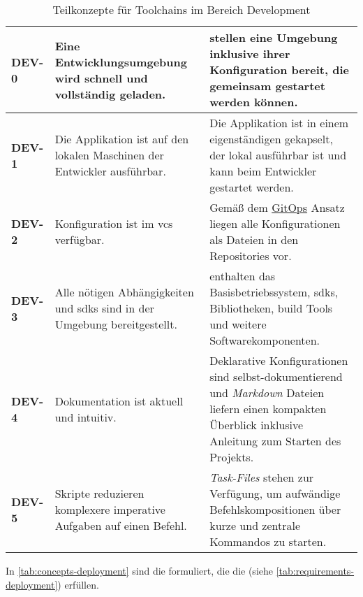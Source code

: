 \begin{table}[H]
    \begin{tabular}{ >{\bfseries\ttfamily}p{} >{}p{} | >{}p{} }
        DEV-0   &   Eine Entwicklungsumgebung wird schnell und vollständig geladen. &
        \nameref{subsec:05-01-02_dev-container} stellen eine Umgebung inklusive ihrer Konfiguration bereit, die gemeinsam gestartet werden können. \\
        \hline
        DEV-1   &   Die Applikation ist auf den lokalen Maschinen der Entwickler ausführbar. &
        Die Applikation ist in einem eigenständigen \nameref{subsec:05-01-01_docker-container} gekapselt, der lokal ausführbar ist und kann beim Entwickler gestartet werden. \\
        \hline
        DEV-2   &   Konfiguration ist im \Gls{vcs} verfügbar. &
        Gemäß dem \hyperref[sec:03-03_gitops-as-further-evolution]{GitOps} Ansatz liegen alle Konfigurationen als Dateien in den Repositories vor. \\
        \hline
        DEV-3   &   Alle nötigen Abhängigkeiten und \Glspl{sdk} sind in der Umgebung bereitgestellt. &
        \nameref{subsec:05-01-01_docker-container} enthalten das Basisbetriebssystem, \Glspl{sdk}, Bibliotheken, \Gls{build} Tools und weitere Softwarekomponenten. \\
        \hline
        DEV-4   &   Dokumentation ist aktuell und intuitiv. &
        Deklarative Konfigurationen sind selbst-dokumentierend und \textit{Markdown} Dateien liefern einen kompakten Überblick inklusive Anleitung zum Starten des Projekts. \\
        \hline
        DEV-5   &   Skripte reduzieren komplexere imperative Aufgaben auf einen Befehl. &
        \textit{Task-Files} stehen zur Verfügung, um aufwändige Befehlskompositionen über kurze und zentrale Kommandos zu starten. \\
    \end{tabular}
    \caption{Teilkonzepte für Toolchains im Bereich Development}
    \label{tab:concepts-development}
\end{table}

In \autoref{tab:concepts-deployment} sind die  formuliert, die die  (siehe \autoref{tab:requirements-deployment}) erfüllen.

